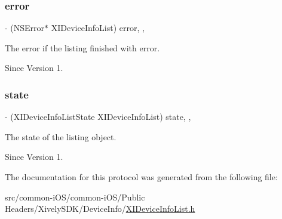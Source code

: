 \subsubsection{\texorpdfstring{error}{error}}
{\footnotesize\ttfamily -\/ (N\+S\+Error$\ast$ X\+I\+Device\+Info\+List) error\hspace{0.3cm}{\ttfamily [read]}, {\ttfamily [nonatomic]}, {\ttfamily [assign]}}



The error if the listing finished with error. 

\begin{DoxySince}{Since}
Version 1. 
\end{DoxySince}
\hypertarget{protocol_x_i_device_info_list_01-p_a8a54bd698b750a713a011f20320d91b8}{}\label{protocol_x_i_device_info_list_01-p_a8a54bd698b750a713a011f20320d91b8} 
\subsubsection{\texorpdfstring{state}{state}}
{\footnotesize\ttfamily -\/ (X\+I\+Device\+Info\+List\+State X\+I\+Device\+Info\+List) state\hspace{0.3cm}{\ttfamily [read]}, {\ttfamily [nonatomic]}, {\ttfamily [assign]}}



The state of the listing object. 

\begin{DoxySince}{Since}
Version 1. 
\end{DoxySince}


The documentation for this protocol was generated from the following file\+:\begin{DoxyCompactItemize}
\item 
src/common-\/i\+O\+S/common-\/i\+O\+S/\+Public Headers/\+Xively\+S\+D\+K/\+Device\+Info/\hyperlink{_x_i_device_info_list_8h}{X\+I\+Device\+Info\+List.\+h}\end{DoxyCompactItemize}
